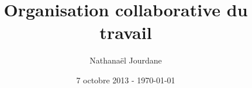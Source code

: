 \documentclass[a4paper,12pt,twoside]{report}
\title{Organisation collaborative du travail}
\author{Nathana{\"e}l Jourdane}
\date{7 octobre 2013 - \today}
\begin{document}
\maketitle
\newpage \tableofcontents







\printglossaries

\appendix

\end{document}
